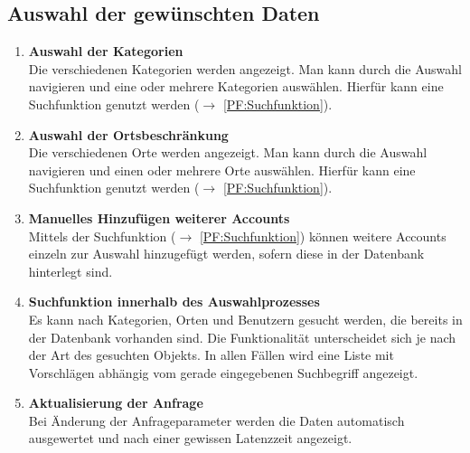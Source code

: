 \subsection{Auswahl der gewünschten Daten} \label{sec:Produktfunktionen}
\begin{enumerate}[ align=left, label={\textbf{\textbackslash F10\arabic*0\textbackslash}} ]
	\item \textbf{Auswahl der Kategorien} \label{PF:KategorienAuswahl}\\ 
	Die verschiedenen Kategorien werden angezeigt. Man kann durch die Auswahl navigieren und eine oder mehrere Kategorien auswählen. Hierfür kann eine Suchfunktion genutzt werden ($\rightarrow$ \ref{PF:Suchfunktion}). 
	\item \textbf{Auswahl der Ortsbeschränkung} \label{PF:OrtAuswahl} \\
	Die verschiedenen Orte werden angezeigt. Man kann durch die Auswahl navigieren und einen oder mehrere Orte auswählen. Hierfür kann eine Suchfunktion genutzt werden ($\rightarrow$ \ref{PF:Suchfunktion}). 
	\item \textbf{Manuelles Hinzufügen weiterer Accounts} \label{PF:AccountHinzufügen} \\
	Mittels der Suchfunktion ($\rightarrow$ \ref{PF:Suchfunktion}) können weitere Accounts einzeln zur Auswahl hinzugefügt werden, sofern diese in der Datenbank hinterlegt sind.
	\item \textbf{Suchfunktion innerhalb des Auswahlprozesses} \label{PF:Suchfunktion} \\
	Es kann nach Kategorien, Orten und Benutzern gesucht werden, die bereits in der Datenbank vorhanden sind. Die Funktionalität unterscheidet sich je nach der Art des gesuchten Objekts. In allen Fällen wird eine Liste mit Vorschlägen abhängig vom gerade eingegebenen Suchbegriff angezeigt. 
	\item \textbf{Aktualisierung der Anfrage} \label{PF:Absenden} \\
	Bei Änderung der Anfrageparameter werden die Daten automatisch ausgewertet und nach einer gewissen Latenzzeit angezeigt.
\end{enumerate}	
